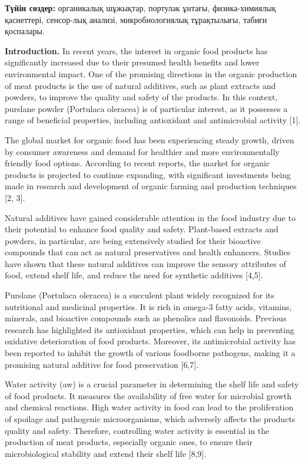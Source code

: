 {\bfseries Түйін сөздер:} органикалық шұжықтар, портулак ұнтағы,
физика-химиялық қасиеттері, сенсор-лық анализі, микробиологиялық
тұрақтылығы, табиғи қоспалары.
\begin{multicols}{2}

{\bfseries Introduction.} In recent years, the interest in organic food
products has significantly increased due to their presumed health
benefits and lower environmental impact. One of the promising directions
in the organic production of meat products is the use of natural
additives, such as plant extracts and powders, to improve the quality
and safety of the products. In this context, purslane powder (Portulaca
oleracea) is of particular interest, as it possesses a range of
beneficial properties, including antioxidant and antimicrobial activity
{[}1{]}.

The global market for organic food has been experiencing steady growth,
driven by consumer awareness and demand for healthier and more
environmentally friendly food options. According to recent reports, the
market for organic products is projected to continue expanding, with
significant investments being made in research and development of
organic farming and production techniques {[}2, 3{]}.

Natural additives have gained considerable attention in the food
industry due to their potential to enhance food quality and safety.
Plant-based extracts and powders, in particular, are being extensively
studied for their bioactive compounds that can act as natural
preservatives and health enhancers. Studies have shown that these
natural additives can improve the sensory attributes of food, extend
shelf life, and reduce the need for synthetic additives {[}4,5{]}.

Purslane (Portulaca oleracea) is a succulent plant widely recognized for
its nutritional and medicinal properties. It is rich in omega-3 fatty
acids, vitamins, minerals, and bioactive compounds such as phenolics and
flavonoids. Previous research has highlighted its antioxidant
properties, which can help in preventing oxidative deterioration of food
products. Moreover, its antimicrobial activity has been reported to
inhibit the growth of various foodborne pathogens, making it a promising
natural additive for food preservation {[}6,7{]}.

Water activity (aw) is a crucial parameter in determining the shelf life
and safety of food products. It measures the availability of free water
for microbial growth and chemical reactions. High water activity in food
can lead to the proliferation of spoilage and pathogenic microorganisms,
which adversely affects the product\textquotesingle s quality and
safety. Therefore, controlling water activity is essential in the
production of meat products, especially organic ones, to ensure their
microbiological stability and extend their shelf life {[}8,9{]}.


\end{multicols}
